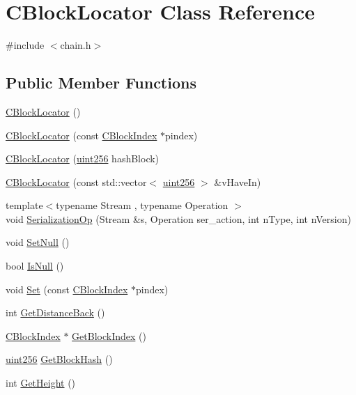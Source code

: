\hypertarget{class_c_block_locator}{}\section{C\+Block\+Locator Class Reference}
\label{class_c_block_locator}


{\ttfamily \#include $<$chain.\+h$>$}

\subsection*{Public Member Functions}
\begin{DoxyCompactItemize}
\item 
\hyperlink{class_c_block_locator_adebf1f63b320776b5c8f529176aa1027}{C\+Block\+Locator} ()
\item 
\hyperlink{class_c_block_locator_a2f30e0b3334f1cb98c7b3079a89743c9}{C\+Block\+Locator} (const \hyperlink{class_c_block_index}{C\+Block\+Index} $\ast$pindex)
\item 
\hyperlink{class_c_block_locator_a16d49c0f443cbe9023de4a1b66af9574}{C\+Block\+Locator} (\hyperlink{classuint256}{uint256} hash\+Block)
\item 
\hyperlink{class_c_block_locator_a12bd4c9c6f4fc9892e2c1f4c8e083226}{C\+Block\+Locator} (const std\+::vector$<$ \hyperlink{classuint256}{uint256} $>$ \&v\+Have\+In)
\item 
{\footnotesize template$<$typename Stream , typename Operation $>$ }\\void \hyperlink{class_c_block_locator_a29de31101d53c3a40d140695c4857c24}{Serialization\+Op} (Stream \&s, Operation ser\+\_\+action, int n\+Type, int n\+Version)
\item 
void \hyperlink{class_c_block_locator_ae103102302c0c4e5ecec109b7dee1512}{Set\+Null} ()
\item 
bool \hyperlink{class_c_block_locator_aa34a6e267a83b4e5b514275f6392ca22}{Is\+Null} ()
\item 
void \hyperlink{class_c_block_locator_abe0917322a7d29a0e080402694237a7b}{Set} (const \hyperlink{class_c_block_index}{C\+Block\+Index} $\ast$pindex)
\item 
int \hyperlink{class_c_block_locator_a7106e425b977d437b21b18e765665879}{Get\+Distance\+Back} ()
\item 
\hyperlink{class_c_block_index}{C\+Block\+Index} $\ast$ \hyperlink{class_c_block_locator_a9109609622705fe47ec42ecc71c59d48}{Get\+Block\+Index} ()
\item 
\hyperlink{classuint256}{uint256} \hyperlink{class_c_block_locator_ac15bd658550c7b803eb39171ed65d4aa}{Get\+Block\+Hash} ()
\item 
int \hyperlink{class_c_block_locator_aea0d210a819144632f4260e1b4d0fe60}{Get\+Height} ()
\end{DoxyCompactItemize}
